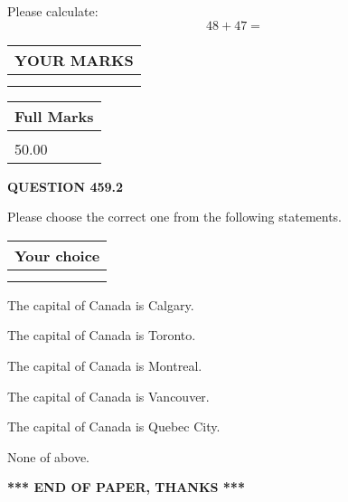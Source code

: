 \documentclass[12pt]{article}
\begin{document}
  
 
Please calculate:
\begin{equation}
48 +  %
47 = \nonumber
\end{equation}
 

 

 
  
\vspace{0.2in}
  
\noindent\begin{tabular}{|l|}
\hline
 YOUR MARKS  \\
\hline
 \\ 
 \\ 
\hline
\end{tabular}
\hspace{0.05in} \begin{tabular}{|l|}
\hline
 Full Marks  \\
\hline
 \\ 
50.00 \\
\hline
\end{tabular}
{\textbf{\Large{QUESTION
459.2 
}}}
  
  
Please choose the correct one from the following statements.
  
  
\noindent\hspace{3.0in} \begin{tabular}{|l|}
\hline
Your choice \\
\hline
 \\ 
 \\ 
\hline
\end{tabular}
  
  
 
 
The capital of Canada is Calgary.
 
 
The capital of Canada is Toronto.
 
 
The capital of Canada is Montreal.
 
 
The capital of Canada is Vancouver.
 
 
The capital of Canada is Quebec City.
 
 
 None of above.
 
 
   
   
 \vspace{0.2in}
 
   
   
   
   
\vspace{1.0in} 
{\textbf{\large{ *** END OF PAPER, THANKS *** }}} 
   
\end{document}
